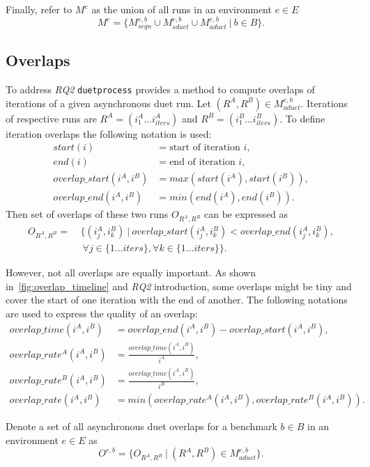 Finally, refer to $M^e$ as the union of all runs in an environment $e \in E$
$$
M^e = \{ M^{e, b}_{seqn} \cup M^{e, b}_{sduet} \cup M^{e, b}_{aduet} ~|~ b \in B \}.
$$


\subsection{Overlaps}
\label{sec:overlaps}

To address \emph{RQ2} \lstinline{duetprocess} provides a method to compute overlaps of iterations of a given asynchronous duet run.
Let $(R^A, R^B) \in M^{e, b}_{aduet}$.
Iterations of respective runs are $R^A = (i^A_1 \dots i^A_{iters})$ and $R^B = (i^B_1 \dots i^B_{iters})$.
To define iteration overlaps the following notation is used:
\begin{align*}
start(i) &= \text{start of iteration } i,\\
end(i) &= \text{end of iteration } i,\\
overlap\_start(i^A, i^B) &= max(start(i^A), start(i^B)),\\
overlap\_end(i^A, i^B) &= min(end(i^A), end(i^B)).
\end{align*} 
Then set of overlaps of these two runs $O_{R^A, R^B}$ can be expressed as
\begin{align*}
O_{R^A, R^B} =&~\{(i^A_j, i^B_k)~|~overlap\_start(i^A_j, i^B_k) < overlap\_end(i^A_j, i^B_k),\\
              &~~\forall j \in \{1 \dots iters\}, \forall k \in \{1 \dots iters\}\}.
\end{align*} 

However, not all overlaps are equally important.
As shown in~\cref{fig:overlap_timeline} and \emph{RQ2} introduction, some overlaps might be tiny and cover the start of one iteration with the end of another.
The following notations are used to express the quality of an overlap:
\begin{align*}
overlap\_time(i^A, i^B) &= overlap\_end(i^A, i^B) - overlap\_start(i^A, i^B), \\
overlap\_rate^A(i^A, i^B) &= \frac{overlap\_time(i^A, i^B)}{i^A}, \\
overlap\_rate^B(i^A, i^B) &= \frac{overlap\_time(i^A, i^B)}{i^B}, \\
overlap\_rate(i^A, i^B) &= min(overlap\_rate^A(i^A, i^B), overlap\_rate^B(i^A, i^B)).
\end{align*}

Denote a set of all asynchronous duet overlaps for a benchmark $b \in B$ in an environment $e \in E$ as
$$
O^{e,b} = \{O_{R^A, R^B}~|~(R^A, R^B) \in M^{e,b}_{aduet}\}.
$$

